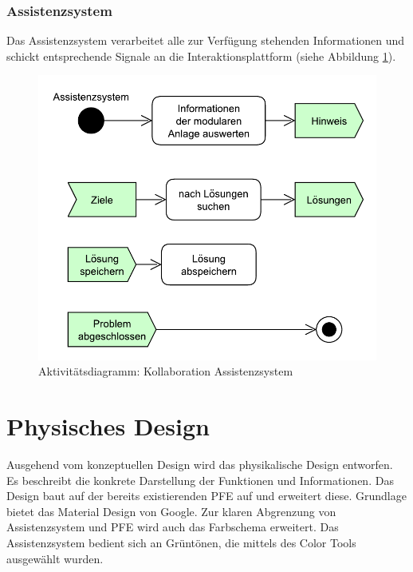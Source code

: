\subsubsection*{Assistenzsystem}
Das Assistenzsystem verarbeitet alle zur Verfügung stehenden Informationen und schickt entsprechende Signale an die Interaktionsplattform (siehe Abbildung \ref{pic:Kollaboration-Assistenzsystem}).
\begin{figure}[htbp]
\centering
\includegraphics[scale=0.5]{DA_files/UML/Konzept/Aktivitaetsdiagramm-Assistenz.pdf}
\caption{Aktivitätsdiagramm: Kollaboration Assistenzsystem}
\label{pic:Kollaboration-Assistenzsystem}
\end{figure}

\section{Physisches Design}
\label{4:Physikalische-Design}
Ausgehend vom konzeptuellen Design wird das physikalische Design entworfen. Es beschreibt die konkrete Darstellung der Funktionen und Informationen. Das Design baut auf der bereits existierenden PFE auf und erweitert diese. Grundlage bietet das Material Design \cite{MaterialDesign} von Google. Zur klaren Abgrenzung von Assistenzsystem und PFE wird auch das Farbschema erweitert. Das Assistenzsystem bedient sich an Grüntönen, die mittels des Color Tools \cite{} ausgewählt wurden.


